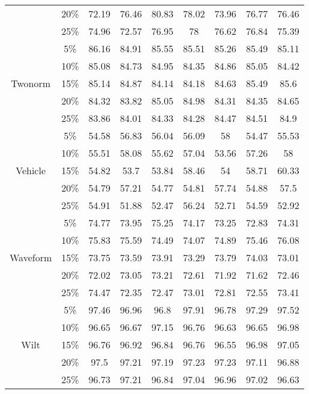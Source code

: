 \begin{longtable}[c]{|c|c|c|c|c|c|c|c|c|}
& 20\% & 72.19 & 76.46 & 80.83 & 78.02 & 73.96 & 76.77 & 76.46\\
& 25\% & 74.96 & 72.57 & 76.95 & 78 & 76.62 & 76.84 & 75.39 \\ \hline
\multirow{5}{*}{Twonorm}
& 5\% & 86.16 & 84.91 & 85.55 & 85.51 & 85.26 & 85.49 & 85.11 \\ 
& 10\% & 85.08 & 84.73 & 84.95 & 84.35 & 84.86 & 85.05 & 84.42 \\
& 15\% & 85.14 & 84.87 & 84.14 & 84.18 & 84.63 & 85.49 & 85.6 \\
& 20\% & 84.32 & 83.82 & 85.05 & 84.98 & 84.31 & 84.35 & 84.65 \\
& 25\% & 83.86 & 84.01 & 84.33 & 84.28 & 84.47 & 84.51 & 84.9 \\ \hline
\multirow{5}{*}{Vehicle}
& 5\% & 54.58 & 56.83 & 56.04 & 56.09 & 58 & 54.47 & 55.53 \\ 
& 10\% & 55.51 & 58.08 & 55.62 & 57.04 & 53.56 & 57.26 & 58 \\
& 15\% & 54.82 & 53.7 & 53.84 & 58.46 & 54 & 58.71 & 60.33 \\
& 20\% & 54.79 & 57.21 & 54.77 & 54.81 & 57.74 & 54.88 & 57.5 \\
& 25\% & 54.91 & 51.88 & 52.47 & 56.24 & 52.71 & 54.59 & 52.92 \\ \hline
\multirow{5}{*}{Waveform}
& 5\% & 74.77 & 73.95 & 75.25 & 74.17 & 73.25 & 72.83 & 74.31 \\ 
& 10\% & 75.83 & 75.59 & 74.49 & 74.07 & 74.89 & 75.46 & 76.08 \\
& 15\% & 73.75 & 73.59 & 73.91 & 73.29 & 73.79 & 74.03 & 73.01 \\
& 20\% & 72.02 & 73.05 & 73.21 & 72.61 & 71.92 & 71.62 & 72.46 \\
& 25\% & 74.47 & 72.35 & 72.47 & 73.01 & 72.81 & 72.55 & 73.41 \\ \hline
\multirow{5}{*}{Wilt}
& 5\% & 97.46 & 96.96 & 96.8 & 97.91 & 96.78 & 97.29 & 97.52 \\ 
& 10\% & 96.65 & 96.67 & 97.15 & 96.76 & 96.63 & 96.65 & 96.98 \\
& 15\% & 96.76 & 96.92 & 96.84 & 96.76 & 96.55 & 96.98 & 97.05 \\
& 20\% & 97.5 & 97.21 & 97.19 & 97.23 & 97.23 & 97.11 & 96.88 \\
& 25\% & 96.73 & 97.21 & 96.84 & 97.04 & 96.96 & 97.02 & 96.63 \\ \hline
\end{longtable}


